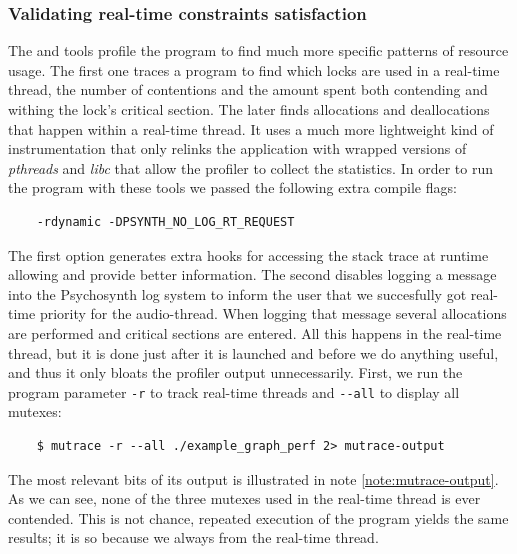 \subsubsection{Validating real-time constraints satisfaction}

The  and  tools profile the program to
find much more specific patterns of resource usage. The first one
traces a program to find which locks are used in a real-time thread,
the number of contentions and the amount spent both contending and
withing the lock's critical section. The later finds allocations and
deallocations that happen within a real-time thread. It uses a much
more lightweight kind of instrumentation that only relinks the
application with wrapped versions of \emph{pthreads} and \emph{libc}
that allow the profiler to collect the statistics. In order to run the
program with these tools we passed the following extra compile
flags:
\begin{verbatim}
    -rdynamic -DPSYNTH_NO_LOG_RT_REQUEST
\end{verbatim}

The first option generates extra hooks for accessing the stack trace
at runtime allowing  and  provide better
information. The second disables logging a message into the
Psychosynth log system to inform the user that we succesfully got
real-time priority for the audio-thread. When logging that message
several allocations are performed and critical sections are
entered. All this happens in the real-time thread, but it is done just
after it is launched and before we do anything useful, and thus it
only bloats the profiler output unnecessarily. First, we run the
program parameter \verb|-r| to track real-time threads and
\verb|--all| to display all mutexes:
\begin{verbatim}
    $ mutrace -r --all ./example_graph_perf 2> mutrace-output
\end{verbatim}

The most relevant bits of its output is illustrated in note
\ref{note:mutrace-output}. As we can see, none of the three mutexes
used in the real-time thread is ever contended. This is not chance,
repeated execution of the program yields the same results; it is so
because we always  from the real-time thread.

